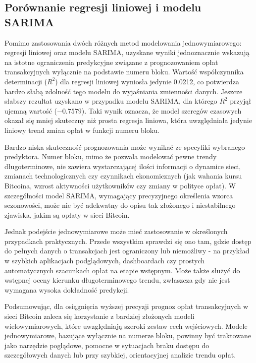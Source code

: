 \documentclass[12pt,a4paper]{report}
\theoremstyle{definition} %
\begin{document}
	\subsection{Porównanie regresji liniowej i modelu SARIMA}
	\hspace*{\parindent}Pomimo zastosowania dwóch różnych metod modelowania jednowymiarowego: regresji liniowej oraz modelu SARIMA, uzyskane wyniki jednoznacznie wskazują na istotne ograniczenia predykcyjne związane z prognozowaniem opłat transakcyjnych wyłącznie na podstawie numeru bloku. Wartość współczynnika determinacji ($R^2$) dla regresji liniowej wyniosła jedynie 0.0212, co potwierdza bardzo słabą zdolność tego modelu do wyjaśniania zmienności danych. Jeszcze słabszy rezultat uzyskano w przypadku modelu SARIMA, dla którego $R^2$ przyjął ujemną wartość ($-0.7579$). Taki wynik oznacza, że model szeregów czasowych okazał się mniej skuteczny niż prosta regresja liniowa, która uwzględniała jedynie liniowy trend zmian opłat w funkcji numeru bloku.
	
	Bardzo niska skuteczność prognozowania może wynikać ze specyfiki wybranego predyktora. Numer bloku, mimo że pozwala modelować pewne trendy długoterminowe, nie zawiera wystarczającej ilości informacji o dynamice sieci, zmianach technologicznych czy czynnikach ekonomicznych (jak wahania kursu Bitcoina, wzrost aktywności użytkowników czy zmiany w polityce opłat). W szczególności model SARIMA, wymagający precyzyjnego określenia wzorca sezonowości, może nie być adekwatny do opisu tak złożonego i niestabilnego zjawiska, jakim są opłaty w sieci Bitcoin.

Jednak podejście jednowymiarowe może mieć zastosowanie w określonych przypadkach praktycznych. Przede wszystkim sprawdzi się ono tam, gdzie dostęp do pełnych danych o transakcjach jest ograniczony lub niemożliwy - na przykład w szybkich aplikacjach podglądowych, dashboardach czy prostych automatycznych szacunkach opłat na etapie wstępnym. Może także służyć do wstępnej oceny kierunku długoterminowego trendu, zwłaszcza gdy nie jest wymagana wysoka dokładność predykcji.

Podsumowując, dla osiągnięcia wyższej precyzji prognoz opłat transakcyjnych w sieci Bitcoin zaleca się korzystanie z bardziej złożonych modeli wielowymiarowych, które uwzględniają szeroki zestaw cech wejściowych. Modele jednowymiarowe, bazujące wyłącznie na numerze bloku, powinny być traktowane jako narzędzie poglądowe, pomocne w sytuacjach braku dostępu do szczegółowych danych lub przy szybkiej, orientacyjnej analizie trendu opłat.
\end{document}

